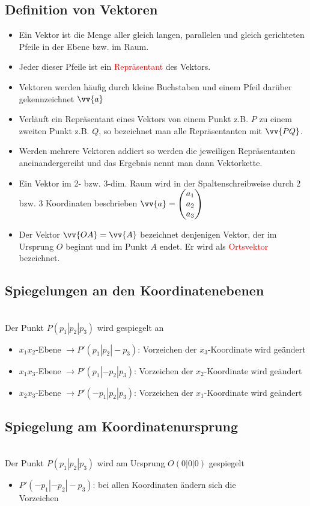\subsection{Definition von Vektoren}
\begin{itemize}
    \item Ein Vektor ist die Menge aller gleich langen, parallelen und gleich gerichteten Pfeile in der Ebene bzw. im Raum.
    \item Jeder dieser Pfeile ist ein \textcolor{red}{Repräsentant} des Vektors.
    \item Vektoren werden häufig durch kleine Buchstaben und einem Pfeil darüber gekennzeichnet $\vv{a}$
    \item Verläuft ein Repräsentant eines Vektors von einem Punkt z.B. $P$ zu einem zweiten Punkt z.B. $Q$, so bezeichnet man alle Repräsentanten mit $\vv{PQ}$.
    \item Werden mehrere Vektoren addiert so werden die jeweiligen Repräsentanten aneinandergereiht und das Ergebnis nennt man dann Vektorkette.
    \item Ein Vektor im 2- bzw. 3-dim. Raum wird in der Spaltenschreibweise durch 2 bzw. 3 Koordinaten beschrieben $\vv{a}= \begin{pmatrix} a_1 \\ a_2 \\ a_3 \end{pmatrix}$
    \item Der Vektor \textcolor{red}{ $\vv{OA} = \vv{A}$} bezeichnet denjenigen Vektor, der im Ursprung $O$ beginnt und im Punkt $A$ endet. Er wird als \textcolor{red}{Ortsvektor} bezeichnet.
\end{itemize}
\subsection{Spiegelungen an den Koordinatenebenen}\\[0.25cm]
Der Punkt $P(p_1|p_2|p_3)$ wird gespiegelt an
\begin{itemize}
\item $x_1x_2$-Ebene $\longrightarrow P'(p_1|p_2|-p_3)$: Vorzeichen der $x_3$-Koordinate wird geändert
\item $x_1x_3$-Ebene $\longrightarrow P'(p_1|-p_2|p_3)$: Vorzeichen der $x_2$-Koordinate wird geändert
\item $x_2x_3$-Ebene $\longrightarrow P'(-p_1|p_2|p_3)$: Vorzeichen der $x_1$-Koordinate wird geändert
\end{itemize}
\subsection{Spiegelung am Koordinatenursprung}\\[0.25cm]
Der Punkt $P(p_1|p_2|p_3)$ wird am Ursprung $O(0|0|0)$ gespiegelt 
\begin{itemize}
\item $P'(-p_1|-p_2|-p_3)$: bei allen Koordinaten ändern sich die \\Vorzeichen
\end{itemize}
